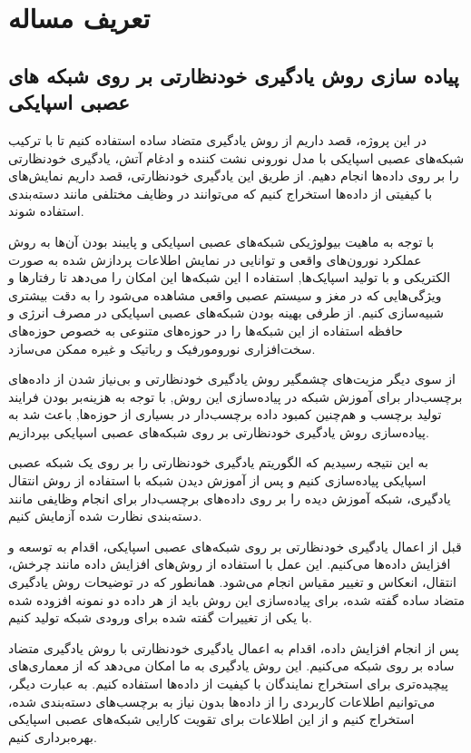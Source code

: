 \clearpage
{}
\chapter{تعریف مساله}

\section{پیاده سازی روش یادگیری خودنظارتی بر روی شبکه های عصبی ‌اسپایکی}


در این پروژه، قصد داریم از روش یادگیری متضاد ساده استفاده کنیم تا با ترکیب شبکه‌های عصبی اسپایکی با مدل نورونی نشت کننده و ادغام آتش، یادگیری خودنظارتی را بر روی داده‌ها انجام دهیم. از طریق این یادگیری خودنظارتی، قصد داریم نمایش‌های با کیفیتی از داده‌ها استخراج کنیم که می‌توانند در وظایف مختلفی مانند دسته‌بندی استفاده شوند.

با توجه به ماهیت بیولوژیکی شبکه‌های عصبی اسپایکی و پایبند بودن آن‌ها به روش عملکرد نورون‌های واقعی و توانایی در نمایش اطلاعات پردازش شده به صورت الکتریکی و با تولید اسپایک‌ها, استفاده ا این شبکه‌ها این امکان را می‌دهد تا رفتارها و ویژگی‌هایی که در مغز و سیستم عصبی واقعی مشاهده می‌شود را به دقت بیشتری شبیه‌سازی کنیم.
از طرفی بهینه بودن شبکه‌های عصبی اسپایکی در مصرف انرژی و حافظه استفاده از این شبکه‌ها را در حوزه‌های متنوعی به خصوص حوزه‌های سخت‌افزاری نورومورفیک و رباتیک و غیره ممکن ‌می‌سازد.

از سوی دیگر مزیت‌های چشمگیر روش یادگیری خودنظارتی و بی‌نیاز شدن از داده‌های برچسب‌دار برای آموزش شبکه در پیاده‌سازی این روش, با توجه به هزینه‌بر بودن فرایند تولید برچسب و هم‌چنین کمبود داده برچسب‌دار در بسیاری از حوزه‌ها, باعث شد به پیاده‌سازی روش یادگیری خودنظارتی بر روی شبکه‌های عصبی اسپایکی بپردازیم.


به این نتیجه رسیدیم که الگوریتم یادگیری خودنظارتی را بر روی یک شبکه عصبی اسپایکی پیاده‌سازی کنیم و پس از آموزش دیدن شبکه با استفاده از روش انتقال یادگیری، شبکه آموزش دیده را بر روی داده‌های برچسب‌دار برای انجام وظایفی مانند دسته‌بندی نظارت شده آزمایش کنیم.

قبل از اعمال یادگیری خودنظارتی بر روی شبکه‌های عصبی اسپایکی، اقدام به توسعه و افزایش داده‌ها می‌کنیم. این عمل با استفاده از روش‌های افزایش داده مانند چرخش، انتقال، انعکاس و تغییر مقیاس انجام می‌شود. همانطور که در توضیحات روش یادگیری متضاد ساده گفته شده، برای پیاده‌سازی این روش باید از هر داده دو نمونه افزوده شده با یکی از تغییرات گفته شده برای ورودی شبکه تولید کنیم.

پس از انجام افزایش داده، اقدام به اعمال یادگیری خودنظارتی با روش یادگیری متضاد ساده بر روی شبکه می‌کنیم. این روش یادگیری به ما امکان می‌دهد که از معماری‌های پیچیده‌تری برای استخراج نمایندگان با کیفیت از داده‌ها استفاده کنیم. به عبارت دیگر، می‌توانیم اطلاعات کاربردی را از داده‌ها بدون نیاز به برچسب‌های دسته‌بندی شده، استخراج کنیم و از این اطلاعات برای تقویت کارایی شبکه‌های عصبی اسپایکی بهره‌برداری کنیم.

